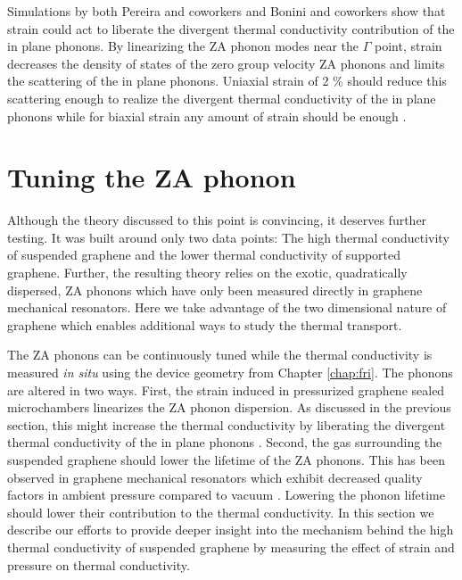 Simulations by both Pereira \cite{Pereira2013} and coworkers and Bonini and coworkers \cite{Bonini2012} show that strain could act to liberate the divergent thermal conductivity contribution of the in plane phonons.
By linearizing the ZA phonon modes near the $\Gamma$ point, strain decreases the density of states of the zero group velocity ZA phonons and limits the scattering of the in plane phonons.
Uniaxial strain of 2 \% should reduce this scattering enough to realize the divergent thermal conductivity of the in plane phonons \cite{Pereira2013} while for biaxial strain any amount of strain should be enough \cite{Bonini2012}.

\section{Tuning the ZA phonon}
Although the theory discussed to this point is convincing, it deserves further testing.
It was built around only two data points: The high thermal conductivity of suspended graphene and the lower thermal conductivity of supported graphene.
Further, the resulting theory relies on the exotic, quadratically dispersed, ZA phonons which have only been measured directly in graphene mechanical resonators.
Here we take advantage of the two dimensional nature of graphene which enables additional ways to study the thermal transport.

The ZA phonons can be continuously tuned while the thermal conductivity is measured \textit{in situ} using the device geometry from Chapter \ref{chap:fri}.
The phonons are altered in two ways.
First, the strain induced in pressurized graphene sealed microchambers linearizes the ZA phonon dispersion.
As discussed in the previous section, this might increase the thermal conductivity by liberating the divergent thermal conductivity of the in plane phonons \cite{Pereira2013,Bonini2012}.
Second, the gas surrounding the suspended graphene should lower the lifetime of the ZA phonons.
This has been observed in graphene mechanical resonators which exhibit decreased quality factors in ambient pressure compared to vacuum \cite{Bunch2007}.
Lowering the phonon lifetime should lower their contribution to the thermal conductivity.
In this section we describe our efforts to provide deeper insight into the mechanism behind the high thermal conductivity of suspended graphene by measuring the effect of strain and pressure on thermal conductivity.

